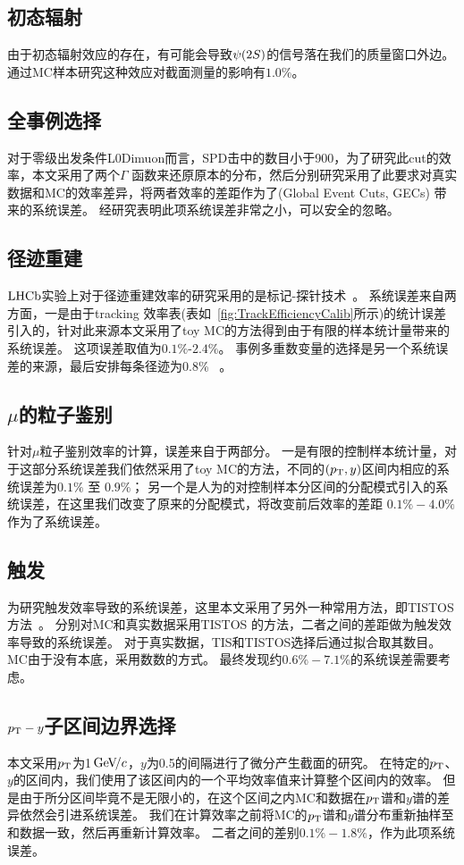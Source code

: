\subsection{初态辐射}
由于初态辐射效应的存在，有可能会导致${\psi{(2S)}}$的信号落在我们的质量窗口外边。
通过MC样本研究这种效应对截面测量的影响有$1.0\%$。

\subsection{全事例选择}
对于零级出发条件L0Dimuon而言，SPD击中的数目小于900，为了研究此cut的效率，本文采用了两个$\Gamma$ 函数来还原原本的分布，然后分别研究采用了此要求对真实数据和MC的效率差异，将两者效率的差距作为了(Global Event Cuts, GECs) 带来的系统误差。
经研究表明此项系统误差非常之小，可以安全的忽略。

\subsection{径迹重建}
$\mbox{LHCb}$实验上对于径迹重建效率的研究采用的是标记-探针技术~\cite{DeCian:1402577}。
系统误差来自两方面，一是由于tracking 效率表(表如~\ref{fig:TrackEfficiencyCalib}所示)的统计误差引入的，针对此来源本文采用了toy MC的方法得到由于有限的样本统计量带来的系统误差。
这项误差取值为$0.1\%$-$2.4\%$。
事例多重数变量的选择是另一个系统误差的来源，最后安排每条径迹为0.8\% ~\cite{Aaij:2014pwa}。

\subsection{$\mu$的粒子鉴别}
针对$\mu$粒子鉴别效率的计算，误差来自于两部分。
一是有限的控制样本统计量，对于这部分系统误差我们依然采用了toy MC的方法，不同的$(\mbox{$p_{\mathrm{ T}}$},y)$区间内相应的系统误差为$0.1\%$ 至 $0.9\%$；
另一个是人为的对控制样本分区间的分配模式引入的系统误差，在这里我们改变了原来的分配模式，将改变前后效率的差距 $0.1\%-4.0\%$作为了系统误差。

\subsection{触发}
为研究触发效率导致的系统误差，这里本文采用了另外一种常用方法，即TISTOS方法~\cite{LHCb-DP-2012-004}。
分别对MC和真实数据采用TISTOS 的方法，二者之间的差距做为触发效率导致的系统误差。
对于真实数据，TIS和TISTOS选择后通过拟合取其数目。
MC由于没有本底，采用数数的方式。
最终发现约$0.6\%-7.1\%$的系统误差需要考虑。

\subsection{$\mbox{$p_{\mathrm{ T}}$}-y$子区间边界选择}
本文采用$\mbox{$p_{\mathrm{ T}}$}$为1${\mathrm{\,Ge\kern -0.1em V\!/}c}$，$y$为0.5的间隔进行了微分产生截面的研究。
在特定的$\mbox{$p_{\mathrm{ T}}$}$、$y$的区间内，我们使用了该区间内的一个平均效率值来计算整个区间内的效率。
但是由于所分区间毕竟不是无限小的，在这个区间之内MC和数据在$\mbox{$p_{\mathrm{ T}}$}$谱和$y$谱的差异依然会引进系统误差。
我们在计算效率之前将MC的$\mbox{$p_{\mathrm{ T}}$}$谱和$y$谱分布重新抽样至和数据一致，然后再重新计算效率。
二者之间的差别$0.1\%-1.8\%$，作为此项系统误差。

